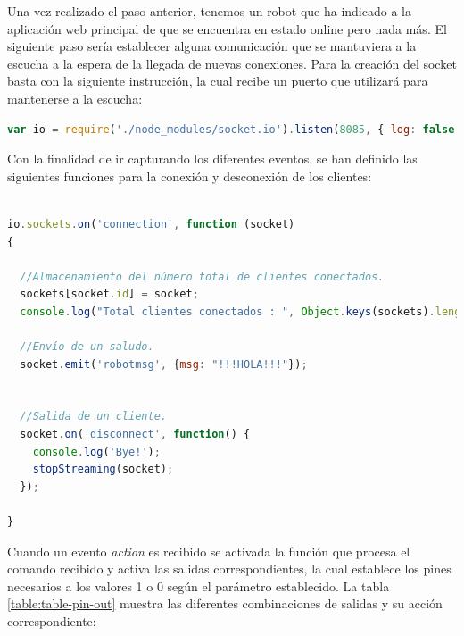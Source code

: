 Una vez realizado el paso anterior, tenemos un robot que ha indicado a la aplicación web principal de que se encuentra en estado online pero nada más. El siguiente paso sería establecer alguna comunicación que se mantuviera a la escucha a 
la espera de la llegada de nuevas conexiones. Para la creación del socket basta con la siguiente instrucción, la cual recibe un puerto que utilizará para mantenerse a la escucha:\\

\begin{lstlisting}[language=JavaScript]
  var io = require('./node_modules/socket.io').listen(8085, { log: false });
\end{lstlisting}


Con la finalidad de ir capturando los diferentes eventos, se han definido las siguientes funciones para la conexión y desconexión de los clientes:\\

\begin{lstlisting}[language=JavaScript]

io.sockets.on('connection', function (socket)
{

  //Almacenamiento del número total de clientes conectados.
  sockets[socket.id] = socket;
  console.log("Total clientes conectados : ", Object.keys(sockets).length);
  
  //Envío de un saludo.
  socket.emit('robotmsg', {msg: "!!!HOLA!!!"});


  //Salida de un cliente.
  socket.on('disconnect', function() {
    console.log('Bye!');
    stopStreaming(socket);
  });  
  
}
\end{lstlisting}

Cuando un evento \emph{action} es recibido se activada la función que procesa el comando recibido y activa las salidas correspondientes, la cual establece los pines necesarios a los valores
1 o 0 según el parámetro establecido. La tabla \ref{table:table-pin-out} muestra las diferentes combinaciones de salidas y su acción correspondiente:


